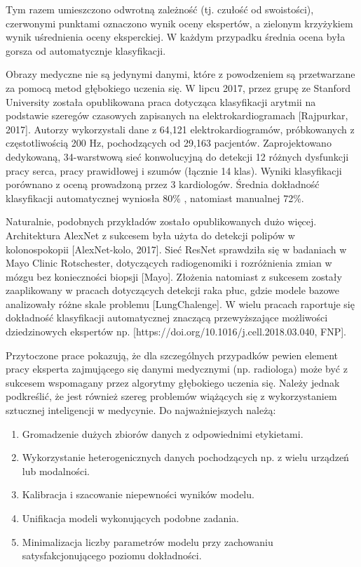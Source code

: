 Tym razem umieszczono odwrotną zależność (tj. czułość od swoistości), czerwonymi punktami oznaczono wynik oceny ekspertów, a zielonym krzyżykiem wynik uśrednienia oceny eksperckiej. W każdym przypadku średnia ocena była gorsza od automatycznje klasyfikacji.

Obrazy medyczne nie są jedynymi danymi, które z powodzeniem są przetwarzane za pomocą metod głębokiego uczenia się. W lipcu 2017, przez grupę ze Stanford University została opublikowana praca dotycząca klasyfikacji arytmii na podstawie szeregów czasowych zapisanych na elektrokardiogramach [Rajpurkar, 2017]. Autorzy wykorzystali dane z 64,121 elektrokardiogramów, próbkowanych z częstotliwością 200 Hz, pochodzących od 29,163 pacjentów. Zaprojektowano dedykowaną, 34-warstwową sieć konwolucyjną do detekcji 12 różnych dysfunkcji pracy serca, pracy prawidłowej i szumów (łącznie 14 klas). Wyniki klasyfikacji porównano z oceną prowadzoną przez 3 kardiologów. Średnia dokładność klasyfikacji automatycznej wyniosła 80\% , natomiast manualnej 72\%.

Naturalnie, podobnych przykładów zostało opublikowanych dużo więcej. Architektura AlexNet z sukcesem była użyta do detekcji polipów w kolonospokopii [AlexNet-kolo, 2017]. Sieć ResNet sprawdziła się w badaniach w Mayo Clinic Rotschester, dotyczących radiogenomiki i rozróżnienia zmian w mózgu bez konieczności biopsji [Mayo]. Złożenia natomiast z sukcesem zostały zaaplikowany w pracach dotyczących detekcji raka płuc, gdzie modele bazowe analizowały różne skale problemu [LungChalenge]. W wielu pracach raportuje się dokładność klasyfikacji automatycznej znaczącą przewyższające możliwości dziedzinowych ekspertów np. [https://doi.org/10.1016/j.cell.2018.03.040, FNP].

 Przytoczone prace pokazują, że dla szczególnych przypadków pewien element pracy eksperta zajmującego się danymi medycznymi (np. radiologa) może być z sukcesem wspomagany przez algorytmy głębokiego uczenia się. Należy jednak podkreślić, że jest również szereg problemów wiążących się z wykorzystaniem sztucznej inteligencji w medycynie. Do najważniejszych należą:
\begin{enumerate}
	\item Gromadzenie dużych zbiorów danych z odpowiednimi etykietami.
	\item Wykorzystanie heterogenicznych danych pochodzących np. z wielu urządzeń lub modalności.
	\item Kalibracja i szacowanie niepewności wyników modelu.
	\item Unifikacja modeli wykonujących podobne zadania.
	\item Minimalizacja liczby parametrów modelu przy zachowaniu satysfakcjonującego poziomu dokładności.
\end{enumerate}

